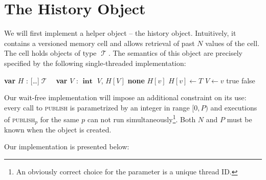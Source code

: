 \documentclass[a4paper,11pt]{article}
\def\none{\textbf{none} }
\def\T{\ensuremath{\operatorname{\mathcal{T}}}\text{ }}
\def\int{\ensuremath{\operatorname{\textbf{int}}}}
\newcommand{\fn}[1]{\textsc{#1}}
\newcommand{\var}[2]{\textbf{var }#1 : #2}
\newcommand{\arrayspec}[1]{\text{array}[#1]\text{ of }}
\begin{document}

\section{The History Object}

We will first implement a helper object -- the history object. Intuitively, it contains a versioned memory cell and allows retrieval of past $N$ values of the cell. The cell holds objects of type \T. The semantics of this object are precisely specified by the following single-threaded implementation:
\begin{algorithmic}[1]
	\filbreak
	\State\var{$H$}{\arrayspec{\ldots}$\T$}
	\State\var{$V$}{\int} %
	\filbreak
		\State \Return $V$, $H[V]$
	\EndFunction
	\filbreak
			\State \Return \none
		\Else
		\State \Return $H[v]$
		\EndIf
	\EndFunction
	\filbreak
			\State $H[v] \gets T$
			\State $V \gets v$
			\State \Return true
		\Else
			\State \Return false
		\EndIf
	\EndFunction
\end{algorithmic}


Our wait-free implementation will impose an additional constraint on its use: every call to \fn{publish} is parametrized by an integer in range $[0,P)$ and executions of \fn{publish$_p$} for the same $p$ can not run simultaneously\footnote{An obviously correct choice for the parameter is a unique thread ID.}.
	Both $N$ and $P$ must be known when the object is created.

Our implementation is presented below:
\end{document}
